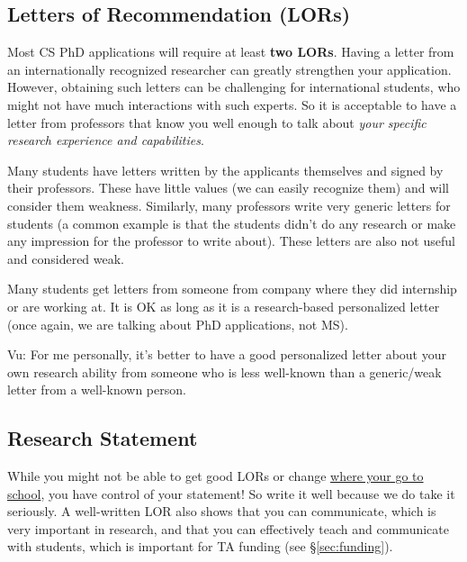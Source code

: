 \documentclass[10pt]{article}
\begin{document}
\subsection{Letters of Recommendation (LORs)}

Most CS PhD applications will require at least \textbf{two LORs}. Having a letter from an internationally recognized researcher can greatly strengthen your application. However, obtaining such letters
can be challenging for international students, who might not have much interactions with such experts. So it is acceptable to have a letter from professors that know you well enough to talk about \emph{your specific research experience and capabilities}.


Many students have letters written by the applicants themselves and signed by their professors. These have little
values (we can easily recognize them) and will consider them weakness.
Similarly, many professors write very generic letters for students (a common example is that the students didn't do any
research or make any impression for the professor to write about). These
letters are also not useful and considered weak.

Many students get letters from someone from company where they did internship or are
working at. It is OK as long as it is a research-based personalized
letter (once again, we are talking about PhD applications, not MS).


\begin{tcolorbox}[left=1pt,right=1pt,top=1pt,bottom=1pt]
Vu: For me personally, it's better to have a good personalized
letter about your own research ability from someone who is less
well-known than a generic/weak letter from a well-known person.
\end{tcolorbox}

\subsection{Research Statement}\label{sec:research-statement}

While you might not be able to get good LORs or change
\hyperref[sec:your-school]{where your go to school}, you have control of your
statement! So write it well because we do take it seriously.
A well-written LOR also shows that you can communicate, which is very important in research, and that you can effectively teach and communicate with students, which is important for TA funding (see \S\ref{sec:funding}).
\end{document}
